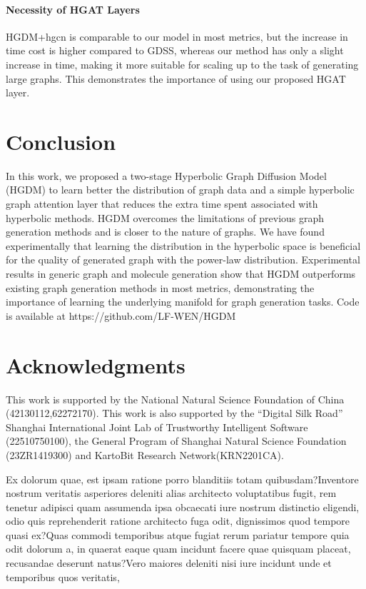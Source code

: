 \documentclass[letterpaper]{article} %
\begin{document}
\paragraph{Necessity of HGAT Layers}
HGDM+hgcn is comparable to our model in most metrics, but the increase in time cost is higher compared to GDSS, whereas our method has only a slight increase in time, making it more suitable for scaling up to the task of generating large graphs.
This demonstrates the importance of using our proposed HGAT layer.
\vspace{-3.27mm}
\section{Conclusion}

In this work, we proposed a two-stage Hyperbolic Graph Diffusion Model (HGDM) to learn better the distribution of graph data and a simple hyperbolic graph attention layer that reduces the extra time spent associated with hyperbolic methods.
HGDM overcomes the limitations of previous graph generation methods and is closer to the nature of graphs.
We have found experimentally that learning the distribution in the hyperbolic space is beneficial for the quality of generated graph with the power-law distribution.
Experimental results in generic graph and molecule generation show that
HGDM outperforms existing graph generation methods in most metrics, demonstrating the importance of learning the underlying manifold for graph generation tasks.
Code is available at https://github.com/LF-WEN/HGDM
\vspace{-3.20mm}
\section*{Acknowledgments}
This work is supported by the National Natural Science Foundation of China (42130112,62272170). This work
is also supported by the ``Digital Silk Road'' Shanghai International Joint Lab of Trustworthy Intelligent Software (22510750100), the General Program of Shanghai Natural Science Foundation (23ZR1419300) and KartoBit Research Network(KRN2201CA).

\bigskip  Ex dolorum quae, est ipsam ratione porro blanditiis totam quibusdam?Inventore nostrum veritatis asperiores deleniti alias architecto voluptatibus fugit, rem tenetur adipisci quam assumenda ipsa obcaecati iure nostrum distinctio eligendi, odio quis reprehenderit ratione architecto fuga odit, dignissimos quod tempore quasi ex?Quas commodi temporibus atque fugiat rerum pariatur tempore quia odit dolorum a, in quaerat eaque quam incidunt facere quae quisquam placeat, recusandae deserunt natus?Vero maiores deleniti nisi iure incidunt unde et temporibus quos veritatis,

\end{document}
